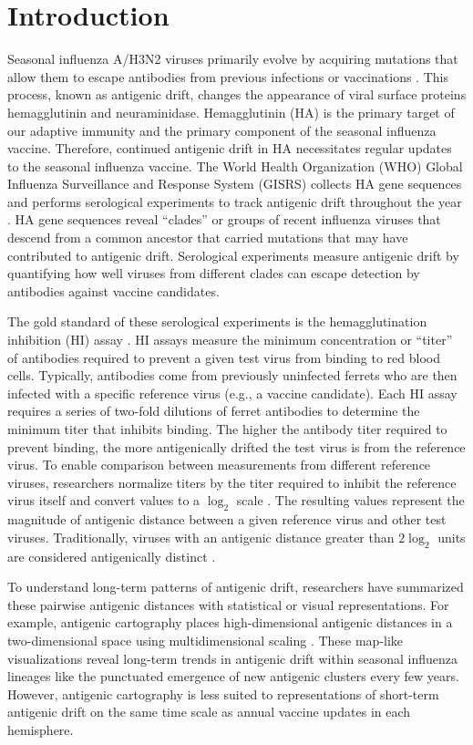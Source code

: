 \documentclass[utf8]{FrontiersinHarvard} %
\begin{document}
\section{Introduction}

Seasonal influenza A/H3N2 viruses primarily evolve by acquiring mutations that allow them to escape antibodies from previous infections or vaccinations \citep{Petrova2018}.
This process, known as antigenic drift, changes the appearance of viral surface proteins hemagglutinin and neuraminidase.
Hemagglutinin (HA) is the primary target of our adaptive immunity and the primary component of the seasonal influenza vaccine.
Therefore, continued antigenic drift in HA necessitates regular updates to the seasonal influenza vaccine.
The World Health Organization (WHO) Global Influenza Surveillance and Response System (GISRS) collects HA gene sequences and performs serological experiments to track antigenic drift throughout the year \citep{Morris:2017ea}.
HA gene sequences reveal ``clades'' or groups of recent influenza viruses that descend from a common ancestor that carried mutations that may have contributed to antigenic drift.
Serological experiments measure antigenic drift by quantifying how well viruses from different clades can escape detection by antibodies against vaccine candidates.

The gold standard of these serological experiments is the hemagglutination inhibition (HI) assay \citep{hirst1943studies}.
HI assays measure the minimum concentration or ``titer'' of antibodies required to prevent a given test virus from binding to red blood cells.
Typically, antibodies come from previously uninfected ferrets who are then infected with a specific reference virus (e.g., a vaccine candidate).
Each HI assay requires a series of two-fold dilutions of ferret antibodies to determine the minimum titer that inhibits binding.
The higher the antibody titer required to prevent binding, the more antigenically drifted the test virus is from the reference virus.
To enable comparison between measurements from different reference viruses, researchers normalize titers by the titer required to inhibit the reference virus itself and convert values to a $\log_{2}$ scale \citep{Neher:2016hy}.
The resulting values represent the magnitude of antigenic distance between a given reference virus and other test viruses.
Traditionally, viruses with an antigenic distance greater than $2\log_{2}$ units are considered antigenically distinct \citep{Katz2011}.

To understand long-term patterns of antigenic drift, researchers have summarized these pairwise antigenic distances with statistical or visual representations.
For example, antigenic cartography places high-dimensional antigenic distances in a two-dimensional space using multidimensional scaling \citep{Smith:2004jc,Bedford:2014bf}.
These map-like visualizations reveal long-term trends in antigenic drift within seasonal influenza lineages like the punctuated emergence of new antigenic clusters every few years.
However, antigenic cartography is less suited to representations of short-term antigenic drift on the same time scale as annual vaccine updates in each hemisphere.
\end{document}
